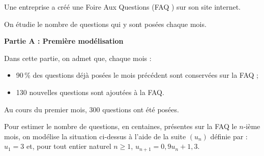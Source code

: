 
\medskip

Une entreprise a créé une Foire Aux Questions (\og FAQ \fg) sur son site internet.


On étudie le nombre de questions qui y sont posées chaque mois.

\bigskip

\textbf{Partie A : Première modélisation}

\medskip

Dans cette partie, on admet que, chaque mois :

\begin{itemize}
\item[$\bullet~~$]90\,\% des questions déjà posées le mois précédent sont conservées sur la FAQ ;
\item[$\bullet~~$]130 nouvelles questions sont ajoutées à la FAQ.
\end{itemize}

Au cours du premier mois, $300$ questions ont été posées.


Pour estimer le nombre de questions, en centaines, présentes sur la FAQ le $n$-ième
mois, on modélise la situation ci-dessus à l'aide de la suite $\left(u_n\right)$ définie par : $u_1 =3$ et, pour tout entier naturel $n \geqslant 1$, $u_{n+1} = 0,9u_n + 1,3$.

